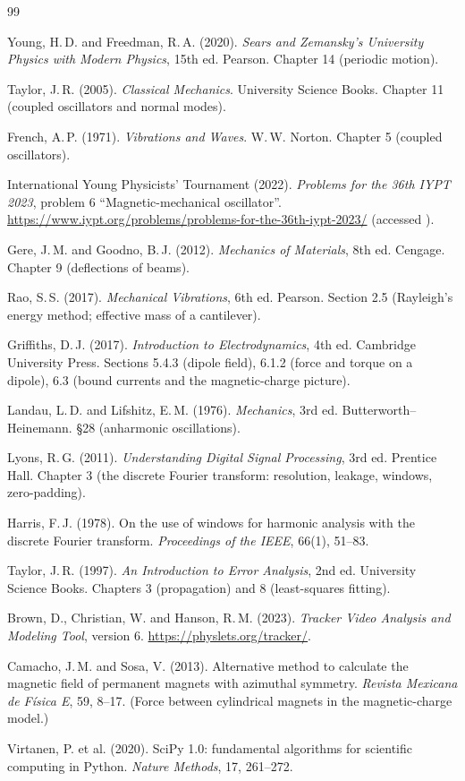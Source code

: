 \clearpage
\begin{thebibliography}{99}
\setlength{\itemsep}{2pt}

 Young, H.\,D. and Freedman, R.\,A. (2020). \emph{Sears and Zemansky's University Physics with Modern Physics}, 15th ed. Pearson. Chapter 14 (periodic motion).

 Taylor, J.\,R. (2005). \emph{Classical Mechanics}. University Science Books. Chapter 11 (coupled oscillators and normal modes).

 French, A.\,P. (1971). \emph{Vibrations and Waves}. W.\,W. Norton. Chapter 5 (coupled oscillators).

 International Young Physicists' Tournament (2022). \emph{Problems for the 36th IYPT 2023}, problem 6 ``Magnetic-mechanical oscillator''. \url{https://www.iypt.org/problems/problems-for-the-36th-iypt-2023/} (accessed ).

 Gere, J.\,M. and Goodno, B.\,J. (2012). \emph{Mechanics of Materials}, 8th ed. Cengage. Chapter 9 (deflections of beams).

 Rao, S.\,S. (2017). \emph{Mechanical Vibrations}, 6th ed. Pearson. Section 2.5 (Rayleigh's energy method; effective mass of a cantilever).

 Griffiths, D.\,J. (2017). \emph{Introduction to Electrodynamics}, 4th ed. Cambridge University Press. Sections 5.4.3 (dipole field), 6.1.2 (force and torque on a dipole), 6.3 (bound currents and the magnetic-charge picture).

 Landau, L.\,D. and Lifshitz, E.\,M. (1976). \emph{Mechanics}, 3rd ed. Butterworth--Heinemann. \S28 (anharmonic oscillations).

 Lyons, R.\,G. (2011). \emph{Understanding Digital Signal Processing}, 3rd ed. Prentice Hall. Chapter 3 (the discrete Fourier transform: resolution, leakage, windows, zero-padding).

 Harris, F.\,J. (1978). On the use of windows for harmonic analysis with the discrete Fourier transform. \emph{Proceedings of the IEEE}, 66(1), 51--83.

 Taylor, J.\,R. (1997). \emph{An Introduction to Error Analysis}, 2nd ed. University Science Books. Chapters 3 (propagation) and 8 (least-squares fitting).

 Brown, D., Christian, W. and Hanson, R.\,M. (2023). \emph{Tracker Video Analysis and Modeling Tool}, version 6. \url{https://physlets.org/tracker/}.

 Camacho, J.\,M. and Sosa, V. (2013). Alternative method to calculate the magnetic field of permanent magnets with azimuthal symmetry. \emph{Revista Mexicana de F\'isica E}, 59, 8--17. (Force between cylindrical magnets in the magnetic-charge model.)

 Virtanen, P. et al. (2020). SciPy 1.0: fundamental algorithms for scientific computing in Python. \emph{Nature Methods}, 17, 261--272.

\end{thebibliography}
